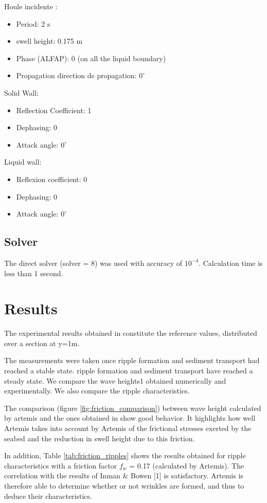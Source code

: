 Houle incidente :
\begin{itemize}
\item Period: 2 s
\item swell height: 0.175 m
\item Phase (ALFAP): 0 (on all the liquid boundary)
\item Propagation direction de propagation: $0^\circ$
\end{itemize}
Solid Wall:
\begin{itemize}
\item Reflection Coefficient: 1
\item Dephasing: 0
\item Attack angle: $0^\circ$
\end{itemize}
Liquid wall:
\begin{itemize}
  \item Reflexion coefficient: 0
\item Dephasing: 0
\item Attack angle: $0^\circ$
\end{itemize}
  
\subsection{Solver}
The direct solver (solver = 8) was used with
accuracy of $10^{-4}$. Calculation time is less than 1 second.

\section{Results}
The experimental results obtained in \cite{CERC1984} constitute the reference
values, distributed over a section at y=1m. 

The measurements were taken once ripple formation and sediment transport had reached a stable state.
ripple formation and sediment transport have reached a steady state. We compare the wave heights1
obtained numerically and experimentally. We also compare the
ripple characteristics.

The comparison (figure \ref{fig:friction_comparison}) between wave height calculated by artemis and
the ones obtained in  \cite{CERC1984} show good behavior. It highlights how well Artemis takes into
account by Artemis of the frictional stresses exerted by the seabed and the reduction in swell height
due to this friction.

In addition, Table \ref{tab:friction_ripples} shows the results obtained for ripple characteristics
with a friction factor
$f_w$ = 0.17 (calculated by Artemis). The correlation with the results of Inman \& Bowen [1] is
satisfactory. Artemis is therefore able to determine whether or not wrinkles are formed, and thus
to deduce their characteristics.

